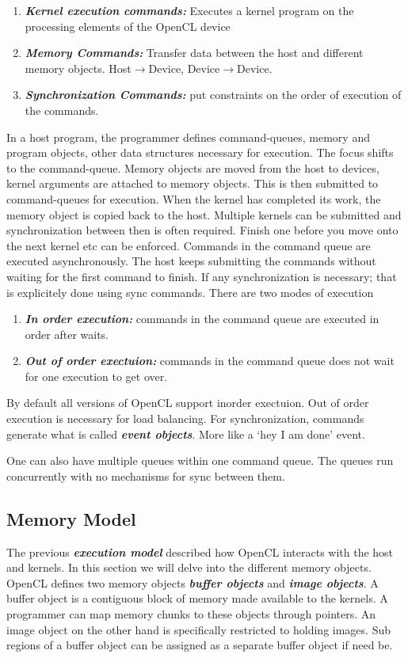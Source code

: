 \documentclass[10pt]{article}
\begin{document}
\begin{enumerate}
	\item \textit{\textbf{Kernel execution commands:}} Executes a kernel program on the processing elements of the OpenCL device
	\item \textit{\textbf{Memory Commands:}} Transfer data between the host and different memory objects. Host$\rightarrow$Device, Device$\rightarrow$Device.
	\item \textit{\textbf{Synchronization Commands:}} put constraints on the order of execution of the commands.
\end{enumerate}

In a host program, the programmer defines command-queues, memory and program objects, other data structures necessary for execution. The focus shifts to the command-queue. Memory objects are moved from the host to devices, kernel arguments are attached to memory objects. This is then submitted to command-queues for execution. When the kernel has completed its work, the memory object is copied back to the host. Multiple kernels can be submitted and synchronization between then is often required. Finish one before you move onto the next kernel etc can be enforced. Commands in the command queue are executed asynchronously. The host keeps submitting the commands without waiting for the first command to finish. If any synchronization is necessary; that is explicitely done using sync commands. There are two modes of execution

\begin{enumerate}
	\item \textit{\textbf{In order execution:}} commands in the command queue are executed in order after waits.
	\item \textit{\textbf{Out of order exectuion:}} commands in the command queue does not wait for one execution to get over.
\end{enumerate}

By default all versions of OpenCL support inorder exectuion. Out of order execution is necessary for load balancing. For synchronization, commands generate what is called \textit{\textbf{event objects}}. More like a `hey I am done' event. 

One can also have multiple queues within one command queue. The queues run concurrently with no mechanisms for sync between them.

\subsection{Memory Model}
The previous \textit{\textbf{execution model}} described how OpenCL interacts with the host and kernels. In this section we will delve into the different memory objects. OpenCL defines two memory objects \textit{\textbf{buffer objects}} and \textit{\textbf{image objects}}. A buffer object is a contiguous block of memory made available to the kernels. A programmer can map memory chunks to these objects through pointers. An image object on the other hand is specifically restricted to holding images. Sub regions of a buffer object can be assigned as a separate buffer object if need be. 
\end{document}
